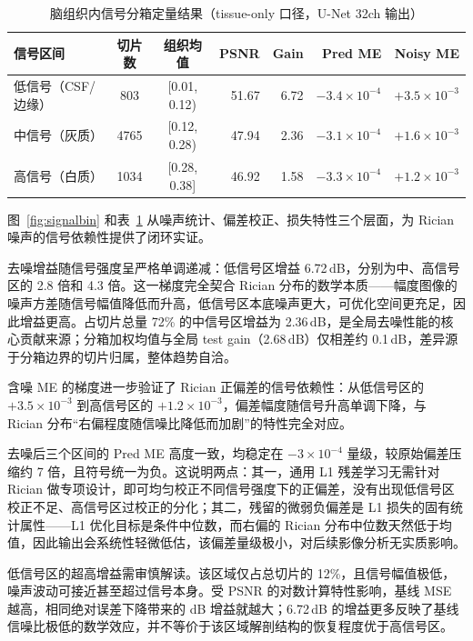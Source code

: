 \documentclass[UTF8,a4paper,12pt]{ctexart}
\begin{document}
\begin{table}[ht]
  \centering
  \caption{脑组织内信号分箱定量结果（tissue-only 口径，U-Net 32ch 输出）}
  \label{tab:signalbin}
  \small
  \begin{tabularx}{\linewidth}{l c c r r r r}
    \toprule
    信号区间 & 切片数 & 组织均值 & PSNR & Gain & Pred ME & Noisy ME \\
    \midrule
    低信号（CSF/边缘） & 803 & [0.01, 0.12) & 51.67 & 6.72 & $-3.4\!\times\!10^{-4}$ & $+3.5\!\times\!10^{-3}$ \\
    中信号（灰质）& 4765 & [0.12, 0.28) & 47.94 & 2.36 & $-3.1\!\times\!10^{-4}$ & $+1.6\!\times\!10^{-3}$ \\
    高信号（白质）& 1034 & [0.28, 0.38] & 46.92 & 1.58 & $-3.3\!\times\!10^{-4}$ & $+1.2\!\times\!10^{-3}$ \\
    \bottomrule
  \end{tabularx}
\end{table}

图~\ref{fig:signalbin} 和表~\ref{tab:signalbin} 从噪声统计、偏差校正、损失特性三个层面，为 Rician 噪声的信号依赖性提供了闭环实证。

去噪增益随信号强度呈严格单调递减：低信号区增益 6.72\,dB，分别为中、高信号区的 2.8 倍和 4.3 倍。这一梯度完全契合 Rician 分布的数学本质——幅度图像的噪声方差随信号幅值降低而升高，低信号区本底噪声更大，可优化空间更充足，因此增益更高。占切片总量 72\% 的中信号区增益为 2.36\,dB，是全局去噪性能的核心贡献来源；分箱加权均值与全局 test gain（2.68\,dB）仅相差约 0.1\,dB，差异源于分箱边界的切片归属，整体趋势自洽。

含噪 ME 的梯度进一步验证了 Rician 正偏差的信号依赖性：从低信号区的 $+3.5\times 10^{-3}$ 到高信号区的 $+1.2\times 10^{-3}$，偏差幅度随信号升高单调下降，与 Rician 分布“右偏程度随信噪比降低而加剧”的特性完全对应。

去噪后三个区间的 Pred ME 高度一致，均稳定在 $-3\times 10^{-4}$ 量级，较原始偏差压缩约 7 倍，且符号统一为负。这说明两点：其一，通用 L1 残差学习无需针对 Rician 做专项设计，即可均匀校正不同信号强度下的正偏差，没有出现低信号区校正不足、高信号区过校正的分化；其二，残留的微弱负偏差是 L1 损失的固有统计属性——L1 优化目标是条件中位数，而右偏的 Rician 分布中位数天然低于均值，因此输出会系统性轻微低估，该偏差量级极小，对后续影像分析无实质影响。

低信号区的超高增益需审慎解读。该区域仅占总切片的 12\%，且信号幅值极低，噪声波动可接近甚至超过信号本身。受 PSNR 的对数计算特性影响，基线 MSE 越高，相同绝对误差下降带来的 dB 增益就越大；6.72\,dB 的增益更多反映了基线信噪比极低的数学效应，并不等价于该区域解剖结构的恢复程度优于高信号区。
\end{document}
